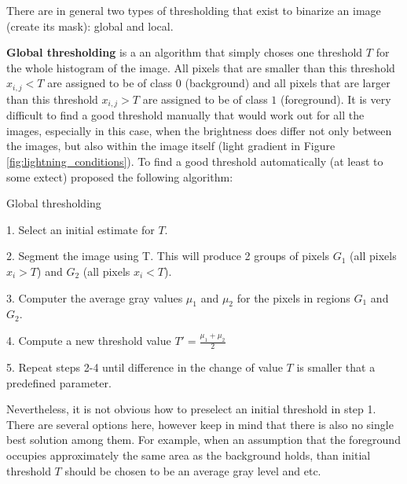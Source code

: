 There are in general two types of thresholding that exist to binarize an image (create its mask): global and local.

\textbf{Global thresholding} is a an algorithm that simply choses one threshold $T$ for the whole histogram of the image. All pixels that are smaller than this threshold $x_{i,j} < T$ are assigned to be of class $0$ (background) and all pixels that are larger than this threshold $x_{i,j} > T$ are assigned to be of class $1$ (foreground). It is very difficult to find a good threshold manually that would work out for all the images, especially in this case, when the brightness does differ not only between the images, but also within the image itself (light gradient in Figure \ref{fig:lightning_conditions}). To find a good threshold automatically (at least to some extect) \cite{digital_image_book} proposed the following algorithm:

\begin{algorithm}
  \caption{Global thresholding}
  \begin{algorithmic}
    \item 1. Select an initial estimate for $T$.
    \item 2. Segment the image using T. This will produce 2 groups of pixels $G_1$ (all pixels $x_i > T$) and $G_2$ (all pixels $x_i < T$).  
    \item 3. Computer the average gray values $\mu_1$ and $\mu_2$ for the pixels in  regions $G_1$ and $G_2$.
    \item 4. Compute a new threshold value 
        $T' = \frac{\mu_1 + \mu_2}{2}$
    \item 5. Repeat steps 2-4 until difference in the change of value $T$ is smaller that a predefined parameter.
  \end{algorithmic}
  \label{alg:global-thresholding}
\end{algorithm}

Nevertheless, it is not obvious how to preselect an initial threshold in step 1. There are several options here, however keep in mind that there is also no single best solution among them. For example, when an assumption that the foreground occupies approximately the same area as the background holds, than initial threshold $T$ should be chosen to be an average gray level and etc.

